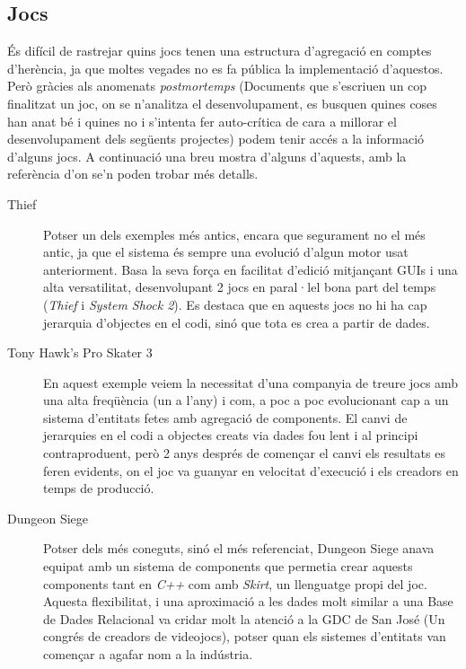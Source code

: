 \subsection{Jocs}

És difícil de rastrejar quins jocs tenen una estructura d'agregació en comptes d'herència, ja que moltes vegades no es fa pública la implementació d'aquestos. Però gràcies als anomenats {\em postmortemps} (Documents que s'escriuen un cop finalitzat un joc, on se n'analitza el desenvolupament, es busquen quines coses han anat bé i quines no i s'intenta fer auto-crítica de cara a millorar el desenvolupament dels següents projectes) podem tenir accés a la informació d'alguns jocs. A continuació una breu mostra d'alguns d'aquests, amb la referència d'on se'n poden trobar més detalls.

\begin{description}
  \item[Thief] \citep{Leonard99} Potser un dels exemples més antics, encara que segurament no el més antic, ja que el sistema és sempre una evolució d'algun motor usat anteriorment. Basa la seva força en facilitat d'edició mitjançant GUIs i una alta versatilitat, desenvolupant 2 jocs en paral·lel bona part del temps ({\em Thief} i {\em System Shock 2}). Es destaca que en aquests jocs no hi ha cap jerarquia d'objectes en el codi, sinó que tota es crea a partir de dades.
    
  \item[Tony Hawk's Pro Skater 3] \citep{West07} En aquest exemple veiem la necessitat d'una companyia de treure jocs amb una alta freqüència (un a l'any) i com, a poc a poc evolucionant cap a un sistema d'entitats fetes amb agregació de components. El canvi de jerarquies en el codi a objectes creats via dades fou lent i al principi contraproduent, però 2 anys després de començar el canvi els resultats es feren evidents, on el joc va guanyar en velocitat d'execució i els creadors en temps de producció.
    
  \item[Dungeon Siege] \citep{Bilas02} Potser dels més coneguts, sinó el més referenciat, Dungeon Siege anava equipat amb un sistema de components que permetia crear aquests components tant en {\em C++} com amb {\em Skirt}, un llenguatge propi del joc. Aquesta flexibilitat, i una aproximació a les dades molt similar a una Base de Dades Relacional va cridar molt la atenció a la GDC de San José (Un congrés de creadors de videojocs), potser quan els sistemes d'entitats van començar a agafar nom a la indústria.
    
\end{description}


